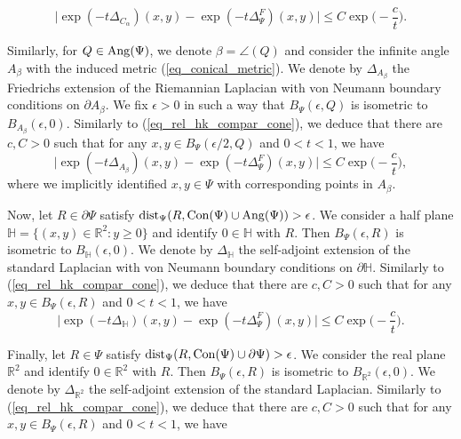\documentclass[12pt]{article}
\numberwithin{equation}{section}
\theoremstyle{theorem}
\theoremstyle{definition}
\theoremstyle{remark}
\newcommand{\real}{\mathbb{R}}
\newcommand{\dist}{{\rm{dist}}}
\newcommand{\laplcomp}{\Delta}
\newcommand{\hh}{\mathbb{H}}
\begin{document}
	\begin{equation}\label{eq_rel_hk_compar_cone}
		\Big| \exp(- t \laplcomp_{C_{\alpha}})(x, y) -  \exp(- t \laplcomp_{\Psi}^{F})(x, y) \Big| \leq C \exp\Big( - \frac{c}{t} \Big).
	\end{equation}
	\par 
	Similarly, for $Q \in {\rm{Ang}}(\Psi)$, we denote $\beta = \angle(Q)$ and consider the infinite angle $A_{\beta}$ with the induced metric (\ref{eq_conical_metric}). We denote by $\laplcomp_{A_{\beta}}$ the Friedrichs extension of the Riemannian Laplacian with von Neumann boundary conditions on $\partial A_{\beta}$. We fix $\epsilon > 0$ in such a way that $B_{\Psi}(\epsilon, Q)$ is isometric to $B_{A_{\beta}}(\epsilon, 0)$.
	Similarly to (\ref{eq_rel_hk_compar_cone}), we deduce that there are $c, C > 0$ such that for any $x, y \in B_{\Psi}(\epsilon/2, Q)$ and $0 < t < 1$, we have
	\begin{equation}\label{eq_rel_hk_compar_angle}
		\Big| \exp(- t \laplcomp_{A_{\beta}})(x, y) -  \exp(- t \laplcomp_{\Psi}^{F})(x, y) \Big| \leq C \exp\Big( - \frac{c}{t} \Big),
	\end{equation}
	where we implicitly identified $x, y \in \Psi$ with corresponding points in $A_{\beta}$.
	\par 
	Now, let $R \in \partial \Psi$ satisfy $\dist_{\Psi}(R, {\rm{Con}}(\Psi) \cup {\rm{Ang}}(\Psi)) > \epsilon$.
	We consider a half plane $\hh = \{(x, y) \in \real^2 : y \geq 0 \}$ and identify $0 \in \hh$ with $R$. Then $B_{\Psi}(\epsilon, R)$ is isometric to $B_{\hh}(\epsilon, 0)$.
	We denote by $\laplcomp_{\hh}$ the self-adjoint extension of the standard Laplacian with von Neumann boundary conditions on $\partial \hh$.
	Similarly to (\ref{eq_rel_hk_compar_cone}), we deduce that there are $c, C > 0$ such that for any $x, y \in B_{\Psi}(\epsilon, R)$ and $0 < t < 1$, we have
	\begin{equation}\label{eq_rel_hk_compar_half}
		\Big| \exp(- t \laplcomp_{\hh})(x, y) -  \exp(- t \laplcomp_{\Psi}^{F})(x, y) \Big| \leq C \exp\Big( - \frac{c}{t} \Big).
	\end{equation}
	\par 
	Finally, let $R \in \Psi$ satisfy $\dist_{\Psi}(R, {\rm{Con}}(\Psi) \cup \partial \Psi) > \epsilon$.
	We consider the real plane $\real^2$ and identify $0 \in \real^2$ with $R$. 
	Then $B_{\Psi}(\epsilon, R)$ is isometric to $B_{\real^2}(\epsilon, 0)$.
	We denote by $\laplcomp_{\real^2}$ the self-adjoint extension of the standard Laplacian.
	Similarly to (\ref{eq_rel_hk_compar_cone}), we deduce that there are $c, C > 0$ such that for any $x, y \in B_{\Psi}(\epsilon, R)$ and $0 < t < 1$, we have
\end{document}

